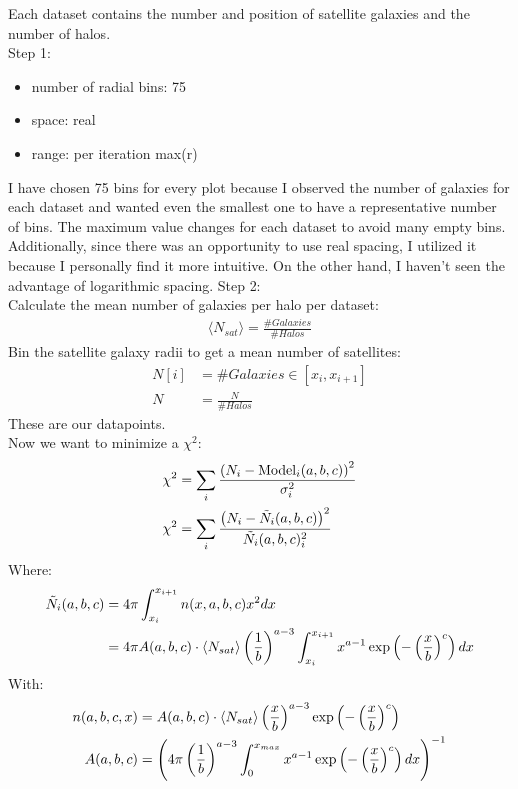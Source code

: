 Each dataset contains the number and position of satellite galaxies and the number of halos.\\
Step 1:\\
\begin{itemize}
    \item number of radial bins: 75
    \item space: real
    \item range: per iteration max(r)
\end{itemize}
I have chosen 75 bins for every plot because I observed the number of galaxies for each dataset and wanted even the smallest one to have a representative number of bins. The maximum value changes for each dataset to avoid many empty bins. Additionally, since there was an opportunity to use real spacing, I utilized it because I personally find it more intuitive. On the other hand, I haven't seen the advantage of logarithmic spacing.
Step 2: \\
Calculate the mean number of galaxies per halo per dataset:
\begin{align}
    \langle N_{sat} \rangle = \frac{\# Galaxies}{\# Halos}
\end{align}
Bin the satellite galaxy radii to get a mean number of satellites:
\begin{align}
    N[i] &= \# Galaxies \in [x_i,x_{i+1}]\\
    N &= \frac{N}{\# Halos}
\end{align}
These are our datapoints. \\
Now we want to minimize a $\chi^2$:
\begin{align}
    \chi^2 &= \sum_i \frac{\left({N_i-\text{Model}_i(a,b,c)}\right)^2}{\sigma_i^2}\\
    \chi^2 &= \sum_i \frac{\left({N_i-\Tilde{N}_i(a,b,c)}\right)^2}{\Tilde{N}_i(a,b,c)_i^2}
\end{align}
Where:
\begin{align}
    \Tilde{N}_i(a,b,c) &= 4 \pi \int_{x_i}^{x_{i+1}}n(x,a,b,c)x^2dx \\
    &= 4 \pi A(a,b,c)\cdot \langle N_{sat} \rangle \left( \frac{1}{b} \right)^{a-3}  \int_{x_i}^{x_{i+1}}x^{a-1} \exp\left({-\left( \frac{x}{b} \right)^{c}}\right) dx
\end{align}
With:
\begin{align}
    n(a,b,c,x) &= A(a,b,c)\cdot \langle N_{sat} \rangle \left( \frac{x}{b} \right)^{a-3} \exp\left({-\left( \frac{x}{b} \right)^{c}}\right)\\
    A(a,b,c) &= \left({4\pi \left( \frac{1}{b} \right)^{a-3} \int_0^{x_{max}} x^{a-1} \exp\left({-\left( \frac{x}{b} \right)^c}\right) dx}\right)^{-1}
\end{align}

